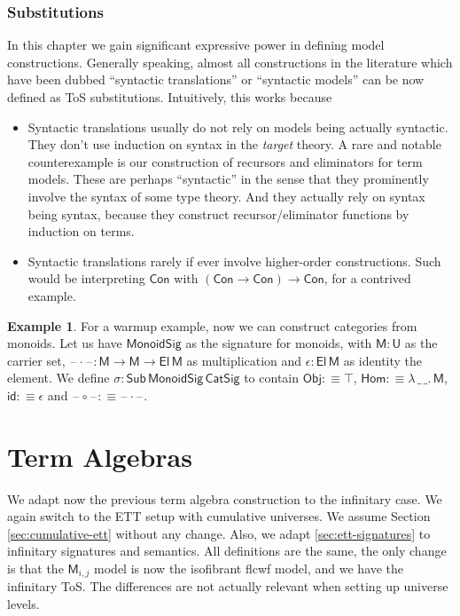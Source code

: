 \documentclass[12pt,a4paper,twoside,openany]{book}
\theoremstyle{remark}
\theoremstyle{definition}
\newtheorem{myexample}{Example}
\theoremstyle{theorem}
\newcommand{\ms}[1]{\mathsf{#1}}
\newcommand{\bs}[1]{\boldsymbol{#1}}
\newcommand{\id}{\mathsf{id}}
\newcommand{\Con}{\mathsf{Con}}
\newcommand{\Sub}{\mathsf{Sub}}
\newcommand{\U}{\mathsf{U}}
\newcommand{\El}{\mathsf{El}}
\newcommand{\blank}{\mathord{\hspace{1pt}\text{--}\hspace{1pt}}}
\newcommand{\bM}{\bs{\mathsf{M}}}
\newcommand{\defn}{:\equiv}
\begin{document}
\subsubsection{Substitutions}


In this chapter we gain significant expressive power in defining model
constructions. Generally speaking, almost all constructions in the literature
which have been dubbed ``syntactic translations'' or ``syntactic models'' can be
now defined as ToS substitutions. Intuitively, this works because
\begin{itemize}
\item
  Syntactic translations usually do not rely on models being actually syntactic.
  They don't use induction on syntax in the \emph{target} theory. A rare and
  notable counterexample is our construction of recursors and eliminators for
  term models. These are perhaps ``syntactic'' in the sense that they
  prominently involve the syntax of some type theory. And they actually rely on
  syntax being syntax, because they construct recursor/eliminator functions by
  induction on terms.
\item
  Syntactic translations rarely if ever involve higher-order constructions.
  Such would be interpreting $\Con$ with $(\Con \to \Con) \to \Con$, for a
  contrived example.
\end{itemize}

\begin{myexample}
For a warmup example, now we can construct categories from monoids. Let us have
$\ms{MonoidSig}$ as the signature for monoids, with $\ms{M} : \U$ as the carrier
set, $\blank\!\cdot\!\blank : \ms{M} \to \ms{M} \to \El\,\ms{M}$ as
multiplication and $\epsilon : \El\,\ms{M}$ as identity the element. We define
$\sigma : \Sub\,\ms{MonoidSig}\,\ms{CatSig}$ to contain $\ms{Obj} \defn \top$,
$\ms{Hom} \defn \lambda\,\_\,\_.\,\ms{M}$, $\id \defn \epsilon$ and
$\blank\!\circ\!\blank \defn \blank\!\cdot\!\blank$.
\end{myexample}



\section{Term Algebras}
\label{sec:inf-term-algebras}

We adapt now the previous term algebra construction to the infinitary
case. We again switch to the ETT setup with cumulative universes. We
assume Section \ref{sec:cumulative-ett} without any change. Also, we adapt
\ref{sec:ett-signatures} to infinitary signatures and semantics. All definitions
are the same, the only change is that the $\bM_{i,j}$ model is now the
isofibrant flcwf model, and we have the infinitary ToS. The differences are not
actually relevant when setting up universe levels.
\end{document}
